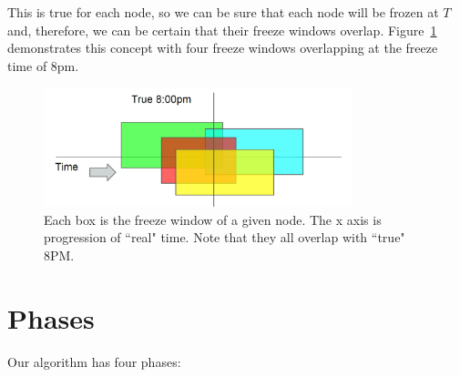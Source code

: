 This is true for 
each node, so we can be sure that each node will be frozen at $T$ and, 
therefore, we can be certain that their freeze windows overlap.
Figure~\ref{fig:overlapping-windows} demonstrates this concept with
four freeze windows overlapping at the freeze time of 8pm.

\begin{figure}[!htbp]
  \centering
  \caption{ Each box is the freeze window of a given node. The x axis is progression of ``real" time. Note that they all overlap with ``true" 8PM.}
  \label{fig:overlapping-windows}
  \includegraphics[width=0.8\textwidth]{overlapping-windows.png}
\end{figure}


\section{Phases}
Our algorithm has four phases:

